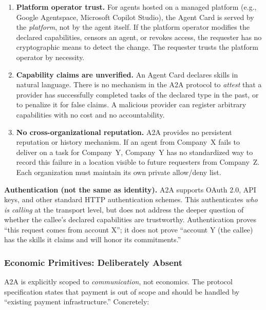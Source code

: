 \documentclass[conference]{IEEEtran}
\begin{document}
\begin{enumerate}
  \item \textbf{Platform operator trust.}  For agents hosted on a
    managed platform (e.g., Google Agentspace, Microsoft Copilot
    Studio), the Agent Card is served by the \emph{platform}, not by
    the agent itself.  If the platform operator modifies the declared
    capabilities, censors an agent, or revokes access, the requester
    has no cryptographic means to detect the change.  The requester
    trusts the platform operator by necessity.

  \item \textbf{Capability claims are unverified.}  An Agent Card
    declares skills in natural language.  There is no mechanism in the
    A2A protocol to \emph{attest} that a provider has successfully
    completed tasks of the declared type in the past, or to penalize
    it for false claims.  A malicious provider can register arbitrary
    capabilities with no cost and no accountability.

  \item \textbf{No cross-organizational reputation.}  A2A provides no
    persistent reputation or history mechanism.  If an agent from
    Company~X fails to deliver on a task for Company~Y, Company~Y has
    no standardized way to record this failure in a location visible to
    future requesters from Company~Z.  Each organization must maintain
    its own private allow/deny list.
\end{enumerate}

\textbf{Authentication (not the same as identity).}
A2A supports OAuth 2.0, API keys, and other standard HTTP
authentication schemes.  This authenticates \emph{who is calling} at
the transport level, but does not address the deeper question of
whether the callee's declared capabilities are trustworthy.
Authentication proves ``this request comes from account X''; it does
not prove ``account Y (the callee) has the skills it claims and will honor its
commitments.''

\subsubsection{Economic Primitives: Deliberately Absent}

A2A is explicitly scoped to \emph{communication}, not economics.  The
protocol specification states that payment is out of scope and should
be handled by ``existing payment infrastructure.''  Concretely:
\end{document}

